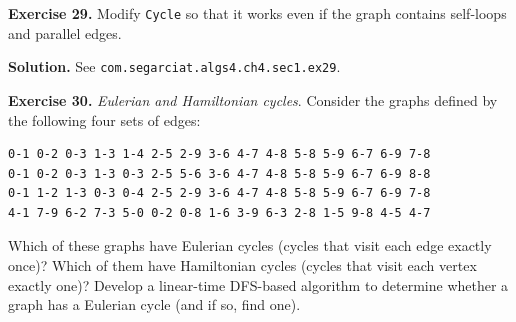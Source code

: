 \documentclass[12pt, a4paper]{article}
\newenvironment{ex}[2][Exercise]
{\par\medskip\noindent \textbf{#1 #2.}}
{\medskip}
\newenvironment{sol}[1][Solution]
{\par\medskip\noindent \textbf{#1.} }
{\medskip}
\begin{document}
	\begin{ex}{29}
		Modify \texttt{Cycle} so that it works even if the graph contains self-loops and
		parallel edges.
	\end{ex}
	\begin{sol}
		See \texttt{com.segarciat.algs4.ch4.sec1.ex29}.
	\end{sol}
	\begin{ex}{30}
		\emph{Eulerian and Hamiltonian cycles}. Consider the graphs defined by the
		following four sets of edges:
		\begin{lstlisting}[language={}]
0-1 0-2 0-3 1-3 1-4 2-5 2-9 3-6 4-7 4-8 5-8 5-9 6-7 6-9 7-8
0-1 0-2 0-3 1-3 0-3 2-5 5-6 3-6 4-7 4-8 5-8 5-9 6-7 6-9 8-8
0-1 1-2 1-3 0-3 0-4 2-5 2-9 3-6 4-7 4-8 5-8 5-9 6-7 6-9 7-8
4-1 7-9 6-2 7-3 5-0 0-2 0-8 1-6 3-9 6-3 2-8 1-5 9-8 4-5 4-7
		\end{lstlisting}
		Which of these graphs have Eulerian cycles (cycles that visit each edge
		exactly once)? Which of them have Hamiltonian cycles (cycles that visit each
		vertex exactly one)? Develop a linear-time DFS-based algorithm to determine
		whether a graph has a Eulerian cycle (and if so, find one).
	\end{ex}
\end{document}
